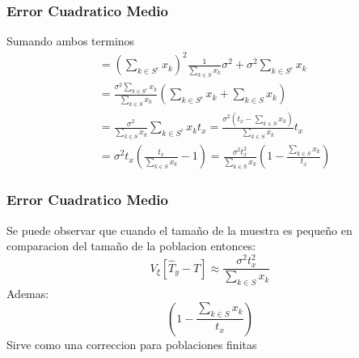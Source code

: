 ﻿\documentclass{beamer}
\begin{document}
\begin{frame}[allowframebreaks*]
\frametitle{Error Cuadratico Medio}
Sumando ambos terminos
\begin{align*}
&=\left(\sum\limits_{k\in S^c}x_k\right)^2\frac{1}{\sum\limits_{k\in S}x_k}\sigma^2+\sigma^2\sum\limits_{k\in S^c}x_k\\
&=\frac{\sigma^2\sum\limits_{k\in S^c}x_k}{\sum\limits_{k\in S}x_k}\left(\sum\limits_{k\in S^c}x_k+\sum\limits_{k\in S}x_k\right)\\
&=\frac{\sigma^2}{\sum\limits_{k\in S}x_k}\sum\limits_{k\in S^c}x_k t_x=\frac{\sigma^2\left(t_x-\sum\limits_{k\in S}x_k\right)}{\sum\limits_{k\in S}x_k} t_x\\
&=\sigma^2t_x\left(\frac{t_x}{\sum\limits_{k\in S}x_k}-1\right)=\frac{\sigma^2t_x^2}{\sum\limits_{k\in S}x_k}\left(1-\frac{\sum\limits_{k\in S}x_k}{t_x}\right)
\end{align*}
\end{frame}

\begin{frame}[allowframebreaks*]
\frametitle{Error Cuadratico Medio}
Se puede observar que cuando el tama\~no de la muestra es peque\~no en comparacion del tama\~no de la poblacion entonces:
$$V_{\xi}\left[\hat T_y-T\right]\approx\frac{\sigma^2t_x^2}{\sum\limits_{k\in S}x_k}$$
Ademas:
$$\left(1-\frac{\sum\limits_{k\in S}x_k}{t_x}\right)$$
Sirve como una correccion para poblaciones finitas
\end{frame}
\end{document}
